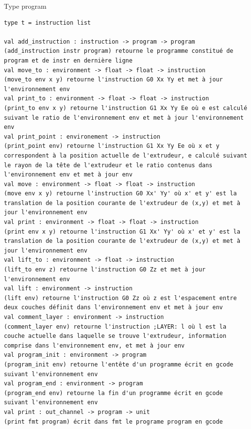 \documentclass[11pt, titlepage]{article}
\begin{document}
\newline
Type program
\begin{lstlisting}
type t = instruction list

val add_instruction : instruction -> program -> program
(add_instruction instr program) retourne le programme constitué de program et de instr en dernière ligne
val move_to : environment -> float -> float -> instruction
(move_to env x y) retourne l'instruction G0 Xx Yy et met à jour l'environnement env
val print_to : environment -> float -> float -> instruction  
(print_to env x y) retourne l'instruction G1 Xx Yy Ee où e est calculé suivant le ratio de l'environnement env et met à jour l'environnement env 
val print_point : environement -> instruction
(print_point env) retourne l'instruction G1 Xx Yy Ee où x et y correspondent à la position actuelle de l'extrudeur, e calculé suivant le rayon de la tête de l'extrudeur et le ratio contenus dans l'environnement env et met à jour env
val move : environment -> float -> float -> instruction
(move env x y) retourne l'instruction G0 Xx' Yy' où x' et y' est la translation de la position courante de l'extrudeur de (x,y) et met à jour l'environnement env
val print : environment -> float -> float -> instruction
(print env x y) retourne l'instruction G1 Xx' Yy' où x' et y' est la translation de la position courante de l'extrudeur de (x,y) et met à jour l'environnement env
val lift_to : environment -> float -> instruction
(lift_to env z) retourne l'instruction G0 Zz et met à jour l'environnement env
val lift : environment -> instruction
(lift env) retourne l'instruction G0 Zz où z est l'espacement entre deux couches définit dans l'environnement env et met à jour env
val comment_layer : environment -> instruction
(comment_layer env) retourne l'instruction ;LAYER: l où l est la couche actuelle dans laquelle se trouve l'extrudeur, information comprise dans l'environnement env, et met à jour env
val program_init : environment -> program
(program_init env) retourne l'entête d'un programme écrit en gcode suivant l'environnement env
val program_end : environment -> program
(program_end env) retourne la fin d'un programme écrit en gcode suivant l'environnement env
val print : out_channel -> program -> unit
(print fmt program) écrit dans fmt le programe program en gcode
\end{lstlisting}
\end{document}
